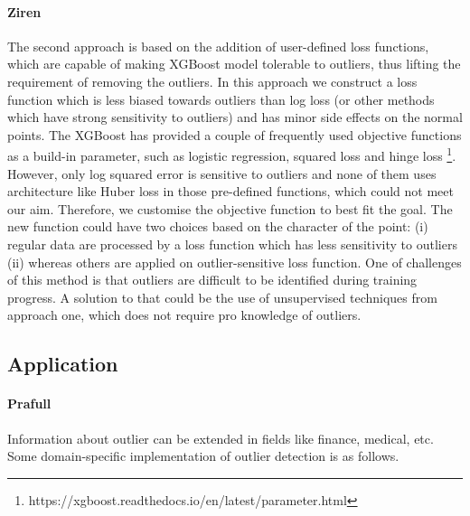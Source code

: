 \documentclass[runningheads]{llncs}
\begin{document}
\paragraph{Ziren} The second approach is based on the addition of user-defined loss functions, which are capable of making XGBoost model tolerable to outliers, thus lifting the requirement of removing the outliers. In this approach we construct a loss function which is less biased towards outliers than log loss (or other methods which have strong sensitivity to outliers) and has minor side effects on the normal points. The XGBoost has provided a couple of frequently used objective functions as a build-in parameter, such as logistic regression, squared loss and hinge loss \footnote{https://xgboost.readthedocs.io/en/latest/parameter.html}. However, only log squared error is sensitive to outliers and none of them uses architecture like Huber loss in those pre-defined functions, which could not meet our aim. Therefore, we customise the objective function to best fit the goal. The new function could have two choices based on the character of the point: (i) regular data are processed by a loss function which has less sensitivity to outliers (ii) whereas others are applied on outlier-sensitive loss function. One of challenges of this method is that outliers are difficult to be identified during training progress. A solution to that could be the use of unsupervised techniques from approach one, which does not require pro knowledge of outliers.



\subsection{Application}
\paragraph{Prafull} Information about outlier can be extended in fields like finance, medical, etc. Some domain-specific implementation of outlier detection is as follows.
\end{document}
